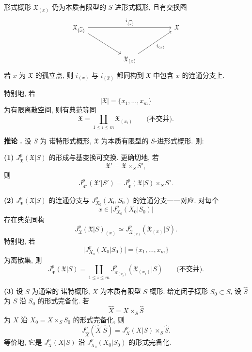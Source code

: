 
形式概形 $\mathfrak X_{(x)}$ 仍为本质有限型的 $S$-进形式概形, 且有交换图
\[
\begin{tikzcd}[column sep=huge,row sep=large]
\mathfrak X_{(\widehat{x})}
  \arrow[rr,"i_{(\widehat{x})}"] \arrow[dr]
  && \mathfrak X \\
& \mathfrak X_{(x)} \arrow[ur,"i_{(x)}"'] & {}
\end{tikzcd}
\]
若 $x$ 为 $\mathfrak X$ 的孤立点, 则 $i_{(x)}$ 与 $i_{(\widehat{x})}$ 都同构到 $\mathfrak X$ 中包含 $x$ 的连通分支上.

特别地, 若
\[
|\mathfrak X|=\{x_1,\ldots,x_m\}
\]
为有限离散空间, 则有典范等同
\[
\mathfrak X=\coprod_{1\leq i\leq m}\mathfrak X_{(x_i)}
\qquad\text{(不交并)}.
\]


\medskip
\noindent\textbf{推论 .}
设 $S$ 为 诺特形式概形, $\mathfrak X$ 为本质有限型的 $S$-进形式概形. 则:

\smallskip
\noindent\textbf{(1)} $J_{\mathfrak X}^p(\mathfrak X|S)$ 的形成与基变换可交换. 更确切地, 若
\[
\mathfrak X'=\mathfrak X\times_SS',
\]
则
\[
J_{\mathfrak X'}^p(\mathfrak X'|S')
=J_{\mathfrak X}^p(\mathfrak X|S)\times_SS'.
\]

\smallskip
\noindent\textbf{(2)} $J_{\mathfrak X}^p(\mathfrak X|S)$ 的连通分支与 $J_{X_0}^p(X_0|S_0)$ 的连通分支一一对应. 对每个
\[
x\in\bigl|J_{X_0}^p(X_0|S_0)\bigr|
\]
存在典范同构
\[
J_{\mathfrak X}^p(\mathfrak X|S)_{(x)}
\simeq
J_{\mathfrak X_{(x)}}^p(\mathfrak X_{(x)}|S).
\]
特别地, 若
\[
\bigl|J_{X_0}^p(X_0|S_0)\bigr|=\{x_1,\ldots,x_m\}
\]
为离散集, 则
\[
J_{\mathfrak X}^p(\mathfrak X|S)
=\coprod_{1\leq i\leq m}
 J_{\mathfrak X_{(x_i)}}^p(\mathfrak X_{(x_i)}|S)
\qquad\text{(不交并)}.
\]


\smallskip
\noindent\textbf{(3)} 设 $S$ 为通常的 诺特概形, $X$ 为本质有限型 $S$-概形. 给定闭子概形 $S_0\subset S$, 设 $\widehat S$ 为 $S$ 沿 $S_0$ 的形式完备化. 若
\[
\widehat X=X\times_S\widehat S
\]
为 $X$ 沿 $X_0=X\times_SS_0$ 的形式完备化, 则
\[
J_{\widehat X}^p(\widehat X|\widehat S)
=J_X^p(X|S)\times_S\widehat S.
\]
等价地, 它是 $J_X^p(X|S)$ 沿 $J_{X_0}^p(X_0|S_0)$ 的形式完备化.

